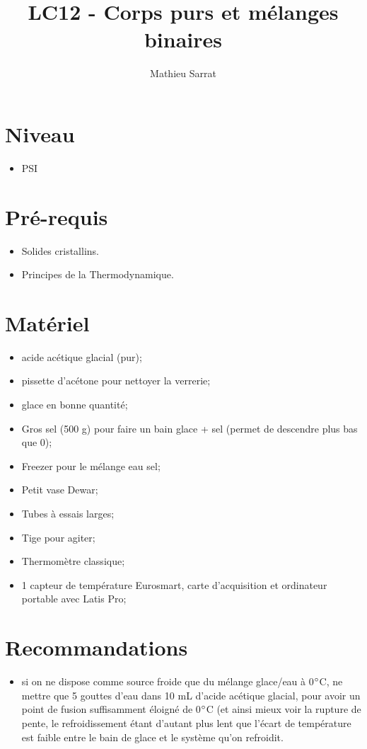 \documentclass[11pt,a4paper]{report}
\author{Mathieu Sarrat}
\title{LC12 - Corps purs et mélanges binaires}
\begin{document}
\maketitle

\section*{Niveau}
\begin{itemize}
	\item PSI
\end{itemize}

\section*{Pré-requis}
\begin{itemize}
	\item Solides cristallins.
	\item Principes de la Thermodynamique.
\end{itemize}

\section*{Matériel}

\begin{itemize}
	\item acide acétique glacial (pur);
	\item pissette d'acétone pour nettoyer la verrerie;
	\item glace en bonne quantité;
	\item Gros sel (500 g) pour faire un bain glace + sel (permet de descendre plus bas que 0);
	\item Freezer pour le mélange eau sel;
	\item Petit vase Dewar;
	\item Tubes à essais larges;
	\item Tige pour agiter;
	\item Thermomètre classique;
	\item 1 capteur de température Eurosmart, 
		carte d'acquisition et ordinateur portable avec Latis Pro;
\end{itemize}

\section*{Recommandations}
\begin{itemize}
	\item si on ne dispose comme source froide que du mélange glace/eau à 0$\degree$C, ne mettre que 5 gouttes d'eau dans 10 mL d'acide acétique glacial, pour avoir un point de fusion suffisamment éloigné de 0$\degree$C (et ainsi mieux voir la rupture de pente, le refroidissement étant d'autant plus lent que l'écart de température est faible entre le bain de glace et le système qu'on refroidit.
\end{itemize}
\end{document}
